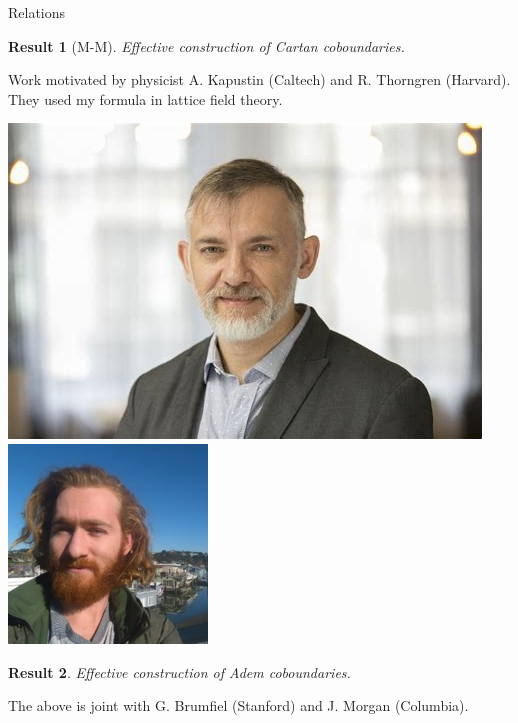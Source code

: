 \documentclass[10pt,t]{beamer} %
\newtheorem{result}{Result}
\begin{document}
\begin{frame}[c]{Relations}
	
	\begin{result}[M-M]
		Effective construction of Cartan coboundaries.
	\end{result}

	Work motivated by physicist A. Kapustin (Caltech) and R. Thorngren (Harvard). They used my formula in lattice field theory.
	
	\begin{center}
		\includegraphics[scale=.13]{kapustin}
		\hspace*{1cm}
		\includegraphics[scale=.21]{thorngren}
	\end{center}
	
	\pause
	
	\begin{result}
		Effective construction of Adem coboundaries.
	\end{result}

	The above is joint with G. Brumfiel (Stanford) and J. Morgan (Columbia).
	

\end{frame}
\end{document}
